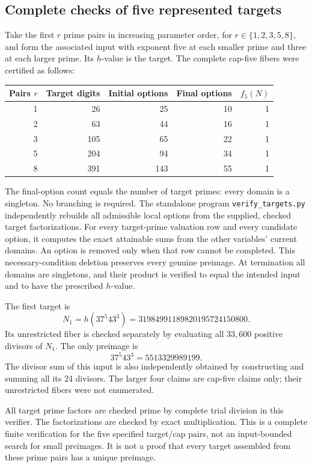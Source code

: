 \documentclass[11pt]{article}
\begin{document}
\subsection{Complete checks of five represented targets}
Take the first $r$ prime pairs in increasing parameter order, for $r\in\{1,2,3,5,8\}$, and form the associated input with exponent five at each smaller prime and three at each larger prime. Its $h$-value is the target. The complete cap-five fibers were certified as follows:
\begin{center}
\begin{tabular}{@{}rrrrr@{}}\toprule
Pairs $r$&Target digits&Initial options&Final options&$f_5(N)$\\\midrule
1&26&25&10&1\\
2&63&44&16&1\\
3&105&65&22&1\\
5&204&94&34&1\\
8&391&143&55&1\\\bottomrule
\end{tabular}
\end{center}
The final-option count equals the number of target primes: every domain is a singleton. No branching is required. The standalone program \texttt{verify\_targets.py} independently rebuilds all admissible local options from the supplied, checked target factorizations. For every target-prime valuation row and every candidate option, it computes the exact attainable sums from the other variables' current domains. An option is removed only when that row cannot be completed. This necessary-condition deletion preserves every genuine preimage. At termination all domains are singletons, and their product is verified to equal the intended input and to have the prescribed $h$-value.

The first target is
\[
 N_1=h(37^5 43^3)=31984991189820195724150800.
\]
Its unrestricted fiber is checked separately by evaluating all $33{,}600$ positive divisors of $N_1$. The only preimage is
\[
 37^5 43^3=5513329989199.
\]
The divisor sum of this input is also independently obtained by constructing and summing all its 24 divisors. The larger four claims are cap-five claims only; their unrestricted fibers were not enumerated.

All target prime factors are checked prime by complete trial division in this verifier. The factorizations are checked by exact multiplication. This is a complete finite verification for the five specified target/cap pairs, not an input-bounded search for small preimages. It is not a proof that every target assembled from these prime pairs has a unique preimage.
\end{document}
